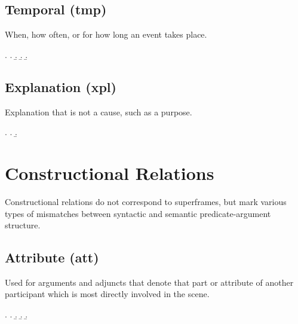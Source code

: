 \documentclass[a4paper]{article}
\begin{document}

\clearpage
\subsection{Temporal (\textsf{tmp})}
\label{sec:tmp}

When, how often, or for how long an event takes place.

\ex.
\a. 
\b. 
\b. 
\b. 


\clearpage
\subsection{Explanation (\textsf{xpl})}
\label{sec:xpl}

Explanation that is not a cause, such as a purpose.

\ex.
\a. 
\b. 


\clearpage
\section{Constructional Relations}

Constructional relations do not correspond to superframes, but mark various
types of mismatches between syntactic and semantic predicate-argument
structure.


\subsection{Attribute (\textsf{att})}
\label{sec:att}

Used for arguments and adjuncts that denote that part or attribute of another
participant which is most directly involved in the scene.

\ex.
\a. 
\b. 
\b. 
\b. 
\end{document}
